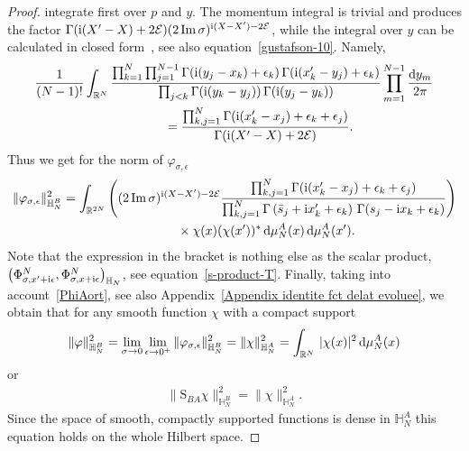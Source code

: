 \documentclass[pdftex]{sigma}%
\numberwithin{equation}{section}
\begin{document}
\begin{proof}
integrate first over $p$ and $y$. The momentum integral is trivial and produces the factor $\Gamma({\rm i}(X'-X)+2\mathcal E) (2
\mathop{\rm Im}\sigma)^{{\rm i}(X-X')-2\mathcal E}$, while the integral over $y$ can be calculated in
 closed form~\cite[Theorem 5.1]{MR1139492}, see also equation~\eqref{gustafson-10}. Namely,
\begin{gather}
\frac1{(N-1)!}\int_{\mathbb R^N}\frac{\prod_{k=1}^N\prod_{j=1}^{N-1} \Gamma({\rm i}(y_j-x_k)+\epsilon_k)\,\Gamma({\rm i}(x'_k-y_j)+\epsilon_k)}
{\prod_{j < k}\Gamma({\rm i}(y_k-y_j))\,\Gamma({\rm i}(y_j-y_k))}
\prod_{m=1}^{N-1} \frac{{\rm d}y_m}{2\pi}\nonumber
\\ \hphantom{\frac1{(N-1)!}}
{}=\frac{\prod_{k,j=1}^{N} \Gamma({\rm i}(x'_k-x_j)+\epsilon_k+\epsilon_j)}{\Gamma({\rm i}(X'-X)+2\mathcal E)}.\label{Gustafson-1}
\end{gather}
Thus we get for the norm of $\varphi_{\sigma,\epsilon}$
\begin{gather}
\|\varphi_{\sigma,\epsilon}\|^2_{\mathbb H_N^B} =\int_{\mathbb R^{2N}}
\left((2\mathop{\rm Im}\sigma)^{{\rm i}(X-X')-2\mathcal E}\frac{\prod_{k,j=1}^{N} \Gamma({\rm i}(x'_k-x_j)+\epsilon_k+\epsilon_j)}{\prod_{k,j=1}^{N}
\Gamma\left(\bar s_j+{\rm i}x'_k+\epsilon_k\right)\,\Gamma( s_j-{\rm i}x_k+\epsilon_k)}\right)\notag
\\ \hphantom{\|\varphi_{\sigma,\epsilon}\|^2_{\mathbb H_N^B} =}
{}\times \chi(x)(\chi(x'))^* \,{\rm d}\mu_N^A(x)\,{\rm d}\mu_N^A(x').\label{varphi_norm_final}
\end{gather}
Note that the expression in the bracket is nothing else as the scalar product,
$\big(\Phi^N_{\sigma,x'+{\rm i}\epsilon},\Phi^N_{\sigma,x+{\rm i}\epsilon}\big)_{ \mathbb H_N }$, see equation~\eqref{s-product-T}. Finally, taking into account~\eqref{PhiAort}, see also Appendix~\ref{Appendix identite fct delat evoluee}, we obtain that for any smooth function $\chi$ with a
compact support
\begin{gather*}
\|\varphi\|^2_{\mathbb H_N^B}=\lim_{\sigma\to 0}\lim_{\epsilon\to 0^+}\|\varphi_{\sigma,\epsilon}\|^2_{ \mathbb H_N^B }
=\|\chi\|^2_{\mathbb H_N^A} =\int_{\mathbb R^{N}}\, |\chi( x)|^2\,{\rm d}\mu_{N}^A(x)
\end{gather*}
or
\begin{gather*}
\|\mathrm S_{BA}\chi\|^2_{\mathbb H_N^B}=\|\chi\|^2_{\mathbb H_N^A}.
\end{gather*}
Since the space of smooth, compactly supported functions is dense in $\mathbb H_N^A$ this equation holds on the whole Hilbert space.
\end{proof}
\end{document}
